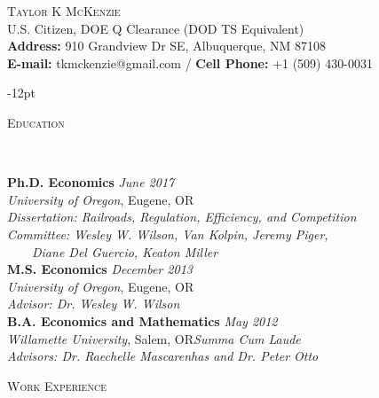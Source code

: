 \documentclass[11pt]{article}
\newenvironment{changemargin}[2]{%
  \begin{list}{}{%
    \setlength{\topsep}{0pt}%
    \setlength{\leftmargin}{#1}%
    \setlength{\rightmargin}{#2}%
    \setlength{\listparindent}{\parindent}%
    \setlength{\itemindent}{\parindent}%
    \setlength{\parsep}{\parskip}%
  }%
  \item[]}{\end{list}
}
\newcommand{\lineover}{
	\begin{changemargin}{-0.05in}{-0.05in}
		\vspace*{-8pt}
		\hrulefill \\
		\vspace*{-2pt}
	\end{changemargin}
}
\newcommand{\header}[1]{
	\begin{changemargin}{-0.5in}{-0.5in}
		\scshape{#1}\\
  	\lineover
	\end{changemargin}
}
\newcommand{\contact}[4]{
	\begin{changemargin}{-0.5in}{-0.5in}
		\begin{center}
			{\Large \scshape {#1}}\\ \smallskip
			{#2}\\ \smallskip 
			{#3}\\ \smallskip
			{#4}\smallskip
		\end{center}
	\end{changemargin}
}
\newenvironment{body} {
	\vspace*{-16pt}
	\begin{changemargin}{-0.25in}{-0.5in}
  }	
	{\end{changemargin}
}
\begin{document}



\contact{\vspace*{-5ex}Taylor K McKenzie}{U.S. Citizen, DOE Q Clearance (DOD TS Equivalent)\\ \textbf{Address:} 910 Grandview Dr SE, Albuquerque, NM 87108}{\vspace*{-0.75ex}\textbf{E-mail:} tkmckenzie@gmail.com / \textbf{Cell Phone:} +1 (509) 430-0031}

\vspace{-12pt}
\header{Education}

\begin{body}
	\vspace{14pt}
	\textbf{Ph.D. Economics}{} \hfill \emph{June 2017}{} \\
	\emph{University of Oregon}, Eugene, OR{}\\
	\emph{Dissertation: Railroads, Regulation, Efficiency, and Competition}\\
	\emph{Committee: Wesley W. Wilson, Van Kolpin, Jeremy Piger,}\\
	\ \ \ \ \emph{Diane Del Guercio, Keaton Miller}\\
	\vspace*{0pt}
  \medskip
	\textbf{M.S. Economics}{} \hfill \emph{December 2013}{} \\
	\emph{University of Oregon}, Eugene, OR{}\\
	\emph{Advisor: Dr. Wesley W. Wilson} \\
	\vspace*{0pt}
  \medskip
  	\textbf{B.A. Economics and Mathematics}{} \hfill \emph{May 2012}{} \\
	\emph{Willamette University}, Salem, OR{}\hfill \emph{Summa Cum Laude}{}\\
	\emph{Advisors: Dr. Raechelle Mascarenhas and Dr. Peter Otto} {} \hfill\\
\end{body}
\smallskip
\header{Work Experience}
\end{document}
